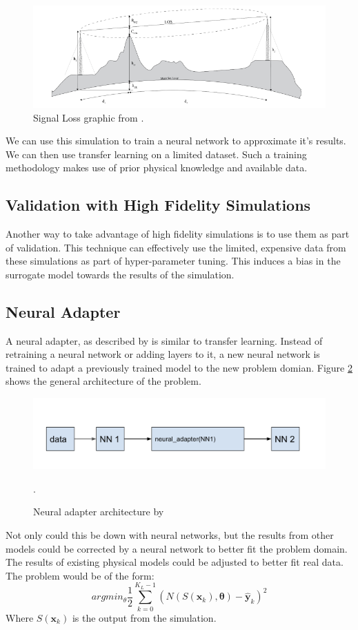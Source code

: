 \documentclass[]{article}
\begin{document}
\begin{figure}
	\centering
	\includegraphics[width=1.0\linewidth]{images/SignalLoss}
	\caption[SigProp]{Signal Loss graphic from \cite{Nicole_SigProp}.}
	\label{fig:signalloss}
\end{figure}

We can use this simulation to train a neural network to approximate it's results.  We can then use transfer learning on a limited dataset.  Such a training methodology makes use of prior physical knowledge and available data.

\subsection{Validation with High Fidelity Simulations}
Another way to take advantage of high fidelity simulations is to use them as part of validation.  This technique can effectively use the limited, expensive data from these simulations as part of hyper-parameter tuning.  This induces a bias in the surrogate model towards the results of the simulation.
\subsection{Neural Adapter}
A neural adapter, as described by \cite{zubov2021neuralpde} is similar to transfer learning.  Instead of retraining a neural network or adding layers to it, a new neural network is trained to adapt a previously trained model to the new problem domian.  Figure \ref{fig:neuraladapter} shows the general architecture of the problem.  
\begin{figure}
	\centering
	\includegraphics[width=1.0\linewidth]{images/neural_adapter}
	\caption[neural adapter]{Neural adapter architecture by \cite{zubov2021neuralpde}}.
	\label{fig:neuraladapter}
\end{figure}
Not only could this be down with neural networks, but the results from other models could be corrected by a neural network to better fit the problem domain.  The results of existing physical models could be adjusted to better fit real data.  The problem would be of the form:
\begin{equation}
arg min_\theta \frac{1}{2}\sum_{k=0}^{K_L - 1}(N(S(\textbf{x}_k), \boldsymbol{\theta}) - \hat{\textbf{y}}_k)^2
\end{equation}
Where $S(\textbf{x}_k)$ is the output from the simulation.
\end{document}
